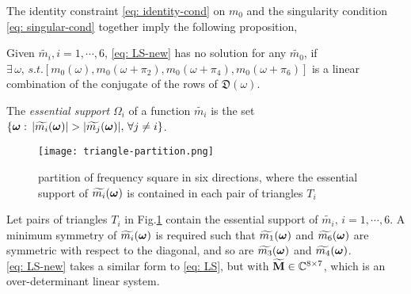 The identity constraint \eqref{eq: identity-cond} on $m_0$ and the singularity condition \eqref{eq: singular-cond} together imply the following proposition,
\begin{proposition}\label{prop: feasibility}
Given $\widetilde{m_i}, i = 1,\cdots,6$, \eqref{eq: LS-new} has no solution for any $\widetilde{m_0}$, if $\exists\,\omega, \,s.t. [m_0(\omega), m_0(\omega+\pi_2),m_0(\omega+\pi_4),m_0(\omega+\pi_6)]$ is a linear combination of the conjugate of the rows of $\mathfrak{D}(\omega)$.%
\end{proposition}
The {\it essential support} $\Omega_i$ of a function $\widetilde{m_i}$ is the set $\{\V{\omega}:\,|\widetilde{m_i}(\V{\omega})|> |\widetilde{m_j}(\V{\omega})|,\,\forall j\neq i\}$. 

\begin{figure}
\centering
\texttt{[image: triangle-partition.png]}
\caption{partition of frequency square in six directions, where the essential support of $\widetilde{m_{i}}(\boldsymbol{\omega})$ is contained in each pair of triangles $T_i$}
\label{fig: partition 2}
\end{figure}
Let pairs of triangles $T_i$ in Fig.\ref{fig: partition 2} contain the essential support of $\widetilde{m_i},\,i=1,\cdots,6$.
A minimum symmetry of $\widetilde{m_{i}}(\boldsymbol{\omega})$ is required such that $\widetilde{m_{1}}(\boldsymbol{\omega})$ and $\widetilde{m_{6}}(\boldsymbol{\omega})$ are symmetric with respect to the diagonal, and so are $\widetilde{m_{3}}(\boldsymbol{\omega})$ and $\widetilde{m_{4}}(\boldsymbol{\omega})$.\\
\eqref{eq: LS-new} takes a similar form to \eqref{eq: LS}, but with $\widetilde{\mathbf{M}}\in\mathbb{C}^{8\times 7}$, which is an over-determinant linear system.

